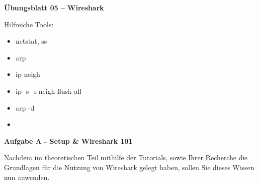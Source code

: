 \documentclass[paper=a4,fontsize=11pt]{scrartcl}%
\numberwithin{equation}{section}
\begin{document}
\begin{center}
\Large{\textbf{Übungsblatt 05 -- Wireshark}}\\
\end{center}
Hilfreiche Tools:
\begin{multicols}{3}
\begin{itemize}
	\item netstat, ss
	\item arp
	\item ip neigh
	\item ip -s -s neigh flush all
	\item arp -d
	\item 
\end{itemize}
\end{multicols}
\begin{center}
\Large{\textbf{Aufgabe A - Setup \& Wireshark 101}}
\end{center}\vskip0.25in
Nachdem im theoretischen Teil mithilfe der Tutorials, sowie Ihrer Recherche die Grundlagen für die Nutzung von Wireshark gelegt haben, sollen Sie dieses Wissen nun anwenden.
\end{document}

